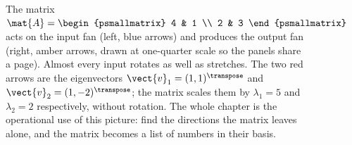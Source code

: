 \begin{figure}[htbp]
\begin{tikzpicture}
\end{tikzpicture}
\caption[Action of a $2 \times 2$ matrix and its eigenvectors]{The
matrix $\mat{A} = \begin{psmallmatrix} 4 & 1 \\ 2 & 3 \end{psmallmatrix}$
acts on the input fan (left, blue arrows) and produces the output fan
(right, amber arrows, drawn at one-quarter scale so the panels share a
page). Almost every input rotates as well as stretches. The two red
arrows are the eigenvectors $\vect{v}_{1} = (1,1)^{\transpose}$ and
$\vect{v}_{2} = (1,-2)^{\transpose}$; the matrix scales them by
$\lambda_{1} = 5$ and $\lambda_{2} = 2$ respectively, without rotation.
The whole chapter is the operational use of this picture: find the
directions the matrix leaves alone, and the matrix becomes a list of
numbers in their basis.}
\label{fig:vol02:ch10:eigenvector-action}
\end{figure}
